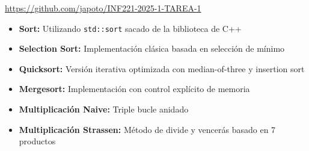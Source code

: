 
\begin{mdframed}
    \begin{center}
        {\Large \url{https://github.com/japoto/INF221-2025-1-TAREA-1}}
    \end{center}
\end{mdframed}
\begin{itemize}
    \item \textbf{Sort:} Utilizando \texttt{std::sort} sacado de la biblioteca de C++ 
    \item \textbf{Selection Sort:} Implementación clásica basada en selección de mínimo
    \item \textbf{Quicksort:} Versión iterativa optimizada con median-of-three y insertion sort
    \item \textbf{Mergesort:} Implementación con control explícito de memoria
    \item \textbf{Multiplicación Naive:} Triple bucle anidado 
    \item \textbf{Multiplicación Strassen:} Método de divide y vencerás basado en 7 productos
\end{itemize}